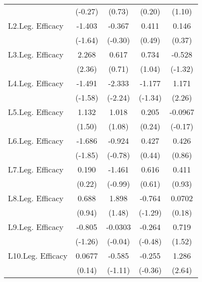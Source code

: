 {\begin{longtable}{l*{4}{c}}
                &  (-0.27)         &   (0.73)         &   (0.20)         &   (1.10)         \\
[1em]
L2.Leg. Efficacy&   -1.403         &   -0.367         &    0.411         &    0.146         \\
                &  (-1.64)         &  (-0.30)         &   (0.49)         &   (0.37)         \\
[1em]
L3.Leg. Efficacy&    2.268\sym{*}  &    0.617         &    0.734         &   -0.528         \\
                &   (2.36)         &   (0.71)         &   (1.04)         &  (-1.32)         \\
[1em]
L4.Leg. Efficacy&   -1.491         &   -2.333\sym{*}  &   -1.177         &    1.171\sym{*}  \\
                &  (-1.58)         &  (-2.24)         &  (-1.34)         &   (2.26)         \\
[1em]
L5.Leg. Efficacy&    1.132         &    1.018         &    0.205         &  -0.0967         \\
                &   (1.50)         &   (1.08)         &   (0.24)         &  (-0.17)         \\
[1em]
L6.Leg. Efficacy&   -1.686         &   -0.924         &    0.427         &    0.426         \\
                &  (-1.85)         &  (-0.78)         &   (0.44)         &   (0.86)         \\
[1em]
L7.Leg. Efficacy&    0.190         &   -1.461         &    0.616         &    0.411         \\
                &   (0.22)         &  (-0.99)         &   (0.61)         &   (0.93)         \\
[1em]
L8.Leg. Efficacy&    0.688         &    1.898         &   -0.764         &   0.0702         \\
                &   (0.94)         &   (1.48)         &  (-1.29)         &   (0.18)         \\
[1em]
L9.Leg. Efficacy&   -0.805         &  -0.0303         &   -0.264         &    0.719         \\
                &  (-1.26)         &  (-0.04)         &  (-0.48)         &   (1.52)         \\
[1em]
L10.Leg. Efficacy&   0.0677         &   -0.585         &   -0.255         &    1.286\sym{**} \\
                &   (0.14)         &  (-1.11)         &  (-0.36)         &   (2.64)         \\

\end{longtable}}
